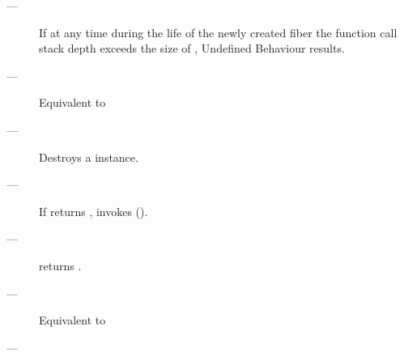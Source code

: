 \remarks
\begin{description}
    \item[---] If at any time during the life of the newly created fiber the
          function call stack depth exceeds the size of , Undefined
          Behaviour results.
\end{description}


\begin{description}
    \item[---] Equivalent to 
\end{description}


\effects
\begin{description}
    \item[---] Destroys a \fiber instance.
    \item[---] If \emptyfn returns \false, invokes  ().
\end{description}



\precond
\begin{description}
    \item[---] \emptyfn returns \true.
\end{description}

\effects
\begin{description}
    \item[---] Equivalent to 
\end{description}

\returns
\begin{description}
    \item[---] \this
\end{description}


